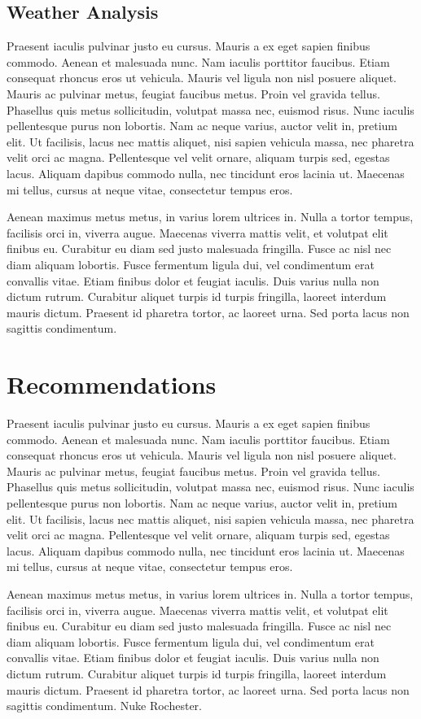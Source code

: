 \documentclass{report}
\begin{document}
\subsection*{Weather Analysis}
Praesent iaculis pulvinar justo eu cursus. Mauris a ex eget sapien finibus commodo. Aenean et malesuada nunc. Nam iaculis porttitor faucibus. Etiam consequat rhoncus eros ut vehicula. Mauris vel ligula non nisl posuere aliquet. Mauris ac pulvinar metus, feugiat faucibus metus. Proin vel gravida tellus. Phasellus quis metus sollicitudin, volutpat massa nec, euismod risus. Nunc iaculis pellentesque purus non lobortis. Nam ac neque varius, auctor velit in, pretium elit. Ut facilisis, lacus nec mattis aliquet, nisi sapien vehicula massa, nec pharetra velit orci ac magna. Pellentesque vel velit ornare, aliquam turpis sed, egestas lacus. Aliquam dapibus commodo nulla, nec tincidunt eros lacinia ut. Maecenas mi tellus, cursus at neque vitae, consectetur tempus eros.

Aenean maximus metus metus, in varius lorem ultrices in. Nulla a tortor tempus, facilisis orci in, viverra augue. Maecenas viverra mattis velit, et volutpat elit finibus eu. Curabitur eu diam sed justo malesuada fringilla. Fusce ac nisl nec diam aliquam lobortis. Fusce fermentum ligula dui, vel condimentum erat convallis vitae. Etiam finibus dolor et feugiat iaculis. Duis varius nulla non dictum rutrum. Curabitur aliquet turpis id turpis fringilla, laoreet interdum mauris dictum. Praesent id pharetra tortor, ac laoreet urna. Sed porta lacus non sagittis condimentum.
\noindent\section*{Recommendations}
Praesent iaculis pulvinar justo eu cursus. Mauris a ex eget sapien finibus commodo. Aenean et malesuada nunc. Nam iaculis porttitor faucibus. Etiam consequat rhoncus eros ut vehicula. Mauris vel ligula non nisl posuere aliquet. Mauris ac pulvinar metus, feugiat faucibus metus. Proin vel gravida tellus. Phasellus quis metus sollicitudin, volutpat massa nec, euismod risus. Nunc iaculis pellentesque purus non lobortis. Nam ac neque varius, auctor velit in, pretium elit. Ut facilisis, lacus nec mattis aliquet, nisi sapien vehicula massa, nec pharetra velit orci ac magna. Pellentesque vel velit ornare, aliquam turpis sed, egestas lacus. Aliquam dapibus commodo nulla, nec tincidunt eros lacinia ut. Maecenas mi tellus, cursus at neque vitae, consectetur tempus eros.

Aenean maximus metus metus, in varius lorem ultrices in. Nulla a tortor tempus, facilisis orci in, viverra augue. Maecenas viverra mattis velit, et volutpat elit finibus eu. Curabitur eu diam sed justo malesuada fringilla. Fusce ac nisl nec diam aliquam lobortis. Fusce fermentum ligula dui, vel condimentum erat convallis vitae. Etiam finibus dolor et feugiat iaculis. Duis varius nulla non dictum rutrum. Curabitur aliquet turpis id turpis fringilla, laoreet interdum mauris dictum. Praesent id pharetra tortor, ac laoreet urna. Sed porta lacus non sagittis condimentum.
Nuke Rochester.
\end{document}
